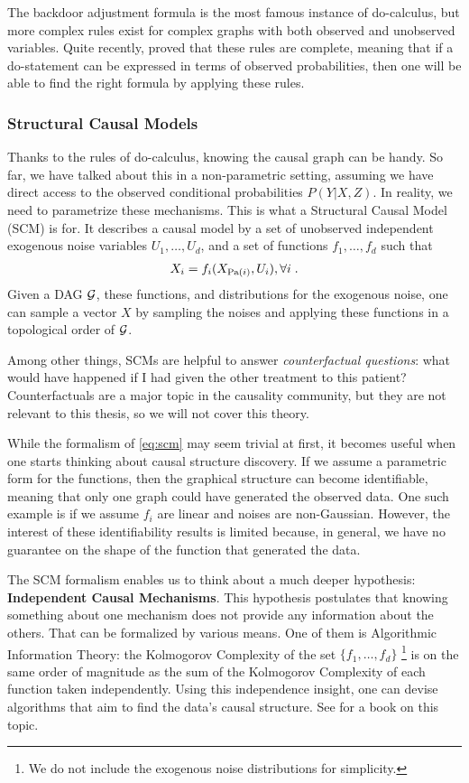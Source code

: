The backdoor adjustment formula is the most famous instance of do-calculus, but more complex rules exist for complex graphs with both observed and unobserved variables. Quite recently, \citet{huang2012pearl} proved that these rules are complete, meaning that if a do-statement can be expressed in terms of observed probabilities, then one will be able to find the right formula by applying these rules. 



\subsubsection{Structural Causal Models}

Thanks to the rules of do-calculus, knowing the causal graph can be handy. So far, we have talked about this in a non-parametric setting, assuming we have direct access to the observed conditional probabilities $P(Y|X, Z)$. In reality, we need to parametrize these mechanisms. This is what a Structural Causal Model (SCM) is for. It describes a causal model by a set of unobserved independent exogenous noise variables $U_1, \dots, U_d$, and a set of functions $f_1, \dots, f_d$ such that
\begin{align}
	X_i = f_i(X_{\operatorname{\mathrm{Pa}}(i)}, U_i), \forall i \;.
	\label{eq:scm}
\end{align}
Given a DAG ${\mathcal G}$, these functions, and distributions for the exogenous noise, one can sample a vector $X$ by sampling the noises and applying these functions in a topological order of ${\mathcal G}$.

Among other things, SCMs are helpful to answer \textit{counterfactual questions}: what would have happened if I had given the other treatment to this patient? Counterfactuals are a major topic in the causality community, but they are not relevant to this thesis, so we will not cover this theory.

While the formalism of \eqref{eq:scm} may seem trivial at first, it becomes useful when one starts thinking about causal structure discovery. 
If we assume a parametric form for the functions, then the graphical structure can become identifiable, meaning that only one graph could have generated the observed data. One such example is if we assume $f_i$ are linear and noises are non-Gaussian. 
However, the interest of these identifiability results is limited because, in general, we have no guarantee on the shape of the function that generated the data. 

The SCM formalism enables us to think about a much deeper hypothesis: \textbf{Independent Causal Mechanisms}. This hypothesis postulates that knowing something about one mechanism does not provide any information about the others. That can be formalized by various means. One of them is Algorithmic Information Theory: the Kolmogorov Complexity of the set $\{ f_1, \dots, f_d \}$
\footnote{We do not include the exogenous noise distributions for simplicity.}
is on the same order of magnitude as the sum of the Kolmogorov Complexity of each function taken independently. 
Using this independence insight, one can devise algorithms that aim to find the data's causal structure. See \citet{peters2017elements} for a book on this topic.

